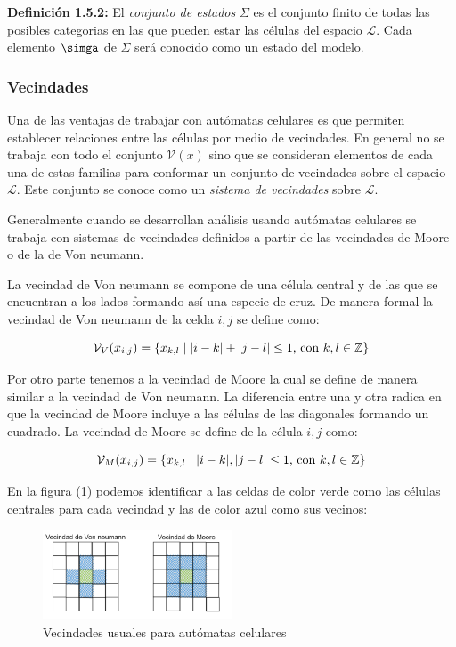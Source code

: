 \textbf{Definición 1.5.2:} El \textit{conjunto de estados} $\Sigma$ es el conjunto finito de todas las posibles categorias en las que pueden estar las células del espacio $\mathcal{L}$. Cada elemento $\simga$ de $\Sigma$ será conocido como un estado del modelo.

\subsubsection{Vecindades}

Una de las ventajas de trabajar con autómatas celulares es que permiten establecer relaciones entre las células por medio de vecindades. En general no se trabaja con todo el conjunto $\mathcal{V}(x)$ sino que se consideran elementos de cada una de estas familias para conformar un conjunto de vecindades sobre el espacio $\mathcal{L}$. Este conjunto se conoce como un \textit{sistema de vecindades} sobre $\mathcal{L}$.

Generalmente cuando se desarrollan análisis usando autómatas celulares se trabaja con sistemas de vecindades definidos a partir de las vecindades de Moore o de la de Von neumann. 

La vecindad de Von neumann se compone de una célula central y de las que se encuentran a los lados formando así una especie de cruz. De manera formal la vecindad de Von neumann de la celda $i,j$ se define como:

$$\mathcal{V}_V(x_{i,j}) = \{x_{k,l}\mid\lvert i-k\rvert+\lvert j-l\rvert\leq1\text{, con }k,l\in\mathbb{Z}\}$$

Por otro parte tenemos a la vecindad de Moore la cual se define de manera similar a la vecindad de Von neumann. La diferencia entre una y otra radica en que la vecindad de Moore incluye a las células de las diagonales formando un cuadrado. La vecindad de Moore se define  de la célula $i,j$ como:

$$\mathcal{V}_M(x_{i,j}) = \{x_{k,l}\mid\lvert i-k\rvert,\lvert j-l\rvert\leq1\text{, con }k,l\in\mathbb{Z}\}$$

En la figura (\ref{fig:Moore - Von neumann}) podemos identificar a las celdas de color verde como las células centrales para cada vecindad y las de color azul como sus vecinos:

\begin{figure}[h]
  \centering
    \includegraphics[width=0.5\textwidth]{Imagenes/vecindades.PNG}
  \caption{Vecindades usuales para autómatas celulares}
  \label{fig:Moore - Von neumann}
\end{figure}

